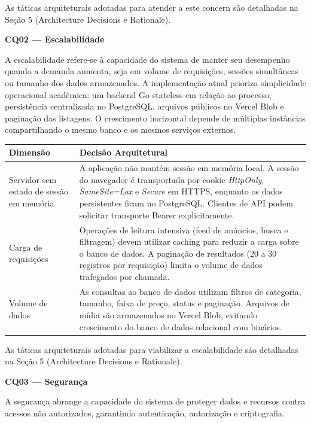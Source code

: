 \documentclass[12pt, a4paper]{article}
\begin{document}
\noindent As táticas arquiteturais adotadas para atender a este concern são detalhadas na Seção 5 (Architecture Decisions e Rationale).

\vspace{0.5cm}

\noindent\textbf{CQ02 --- Escalabilidade}

A escalabilidade refere-se à capacidade do sistema de manter seu desempenho quando a demanda aumenta, seja em volume de requisições, sessões simultâneas ou tamanho dos dados armazenados. A implementação atual prioriza simplicidade operacional acadêmica: um backend Go stateless em relação ao processo, persistência centralizada no PostgreSQL, arquivos públicos no Vercel Blob e paginação das listagens. O crescimento horizontal depende de múltiplas instâncias compartilhando o mesmo banco e os mesmos serviços externos.

\begin{longtable}{|p{4.5cm}|p{10cm}|}
\hline
\textbf{Dimensão} & \textbf{Decisão Arquitetural} \\
\hline
Servidor sem estado de sessão em memória & A aplicação não mantém sessão em memória local. A sessão do navegador é transportada por cookie \textit{HttpOnly}, \textit{SameSite=Lax} e \textit{Secure} em HTTPS, enquanto os dados persistentes ficam no PostgreSQL. Clientes de API podem solicitar transporte Bearer explicitamente. \\
\hline
Carga de requisições & Operações de leitura intensiva (feed de anúncios, busca e filtragem) devem utilizar caching para reduzir a carga sobre o banco de dados. A paginação de resultados (20 a 30 registros por requisição) limita o volume de dados trafegados por chamada. \\
\hline
Volume de dados & As consultas ao banco de dados utilizam filtros de categoria, tamanho, faixa de preço, status e paginação. Arquivos de mídia são armazenados no Vercel Blob, evitando crescimento do banco de dados relacional com binários. \\
\hline
\end{longtable}

\noindent As táticas arquiteturais adotadas para viabilizar a escalabilidade são detalhadas na Seção 5 (Architecture Decisions e Rationale).

\vspace{0.5cm}

\noindent\textbf{CQ03 --- Segurança}

A segurança abrange a capacidade do sistema de proteger dados e recursos contra acessos não autorizados, garantindo autenticação, autorização e criptografia.
\end{document}
